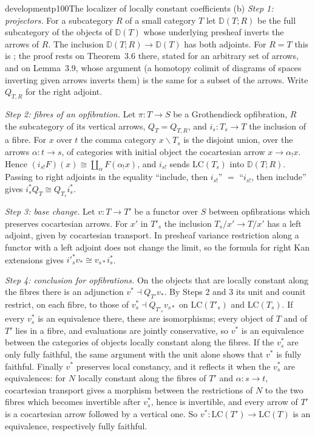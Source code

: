 \begin{dcomment}{development}{p100}{The localizer of locally constant coefficients}
(b) \emph{Step 1: projectors.} For a subcategory $R$ of a small category $T$ let $\mathbb D(T;R)$ be the full subcategory of the objects of $\mathbb D(T)$ whose underlying presheaf inverts the arrows of $R$. The inclusion $\mathbb D(T;R)\to\mathbb D(T)$ has both adjoints. For $R=T$ this is \citet[Proposition~3.10 and Theorem~3.13]{Cisinski2009LocallyConstant}; the proof rests on Theorem~3.6 there, stated for an arbitrary set of arrows, and on Lemma~3.9, whose argument (a homotopy colimit of diagrams of spaces inverting given arrows inverts them) is the same for a subset of the arrows. Write $Q_{T,R}$ for the right adjoint.

\emph{Step 2: fibres of an opfibration.} Let $\pi:T\to S$ be a Grothendieck opfibration, $R$ the subcategory of its vertical arrows, $Q_T=Q_{T,R}$, and $i_s:T_s\to T$ the inclusion of a fibre. For $x$ over $t$ the comma category $x\backslash T_s$ is the disjoint union, over the arrows $\alpha:t\to s$, of categories with initial object the cocartesian arrow $x\to\alpha_!x$. Hence $(i_{s!}F)(x)\cong\coprod_\alpha F(\alpha_!x)$, and $i_{s!}$ sends $\mathrm{LC}(T_s)$ into $\mathbb D(T;R)$. Passing to right adjoints in the equality ``include, then $i_{s!}$'' $=$ ``$i_{s!}$, then include'' gives $i_s^*Q_T\cong Q_{T_s}i_s^*$.

\emph{Step 3: base change.} Let $v:T\to T'$ be a functor over $S$ between opfibrations which preserves cocartesian arrows. For $x'$ in $T'_s$ the inclusion $T_s/x'\to T/x'$ has a left adjoint, given by cocartesian transport. In presheaf variance restriction along a functor with a left adjoint does not change the limit, so the formula for right Kan extensions gives $i'^{*}_sv_*\cong v_{s*}i_s^*$.

\emph{Step 4: conclusion for opfibrations.} On the objects that are locally constant along the fibres there is an adjunction $v^*\dashv Q_{T'}v_*$. By Steps 2 and 3 its unit and counit restrict, on each fibre, to those of $v_s^*\dashv Q_{T'_s}v_{s*}$ on $\mathrm{LC}(T'_s)$ and $\mathrm{LC}(T_s)$. If every $v_s^*$ is an equivalence there, these are isomorphisms; every object of $T$ and of $T'$ lies in a fibre, and evaluations are jointly conservative, so $v^*$ is an equivalence between the categories of objects locally constant along the fibres. If the $v_s^*$ are only fully faithful, the same argument with the unit alone shows that $v^*$ is fully faithful. Finally $v^*$ preserves local constancy, and it reflects it when the $v_s^*$ are equivalences: for $N$ locally constant along the fibres of $T'$ and $\alpha:s\to t$, cocartesian transport gives a morphism between the restrictions of $N$ to the two fibres which becomes invertible after $v_s^*$, hence is invertible, and every arrow of $T'$ is a cocartesian arrow followed by a vertical one. So $v^*:\mathrm{LC}(T')\to\mathrm{LC}(T)$ is an equivalence, respectively fully faithful.


\end{dcomment}
